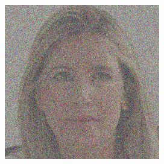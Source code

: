 \begin{figure}[H]
\begin{minipage}[b]{0.3\linewidth}
  \end{minipage}
\hspace{0.1cm}
  \begin{minipage}[b]{0.3\linewidth}
    \includegraphics[width=\linewidth]{Picture/progress/box/x_0200.png}
  \end{minipage}
\end{figure}

